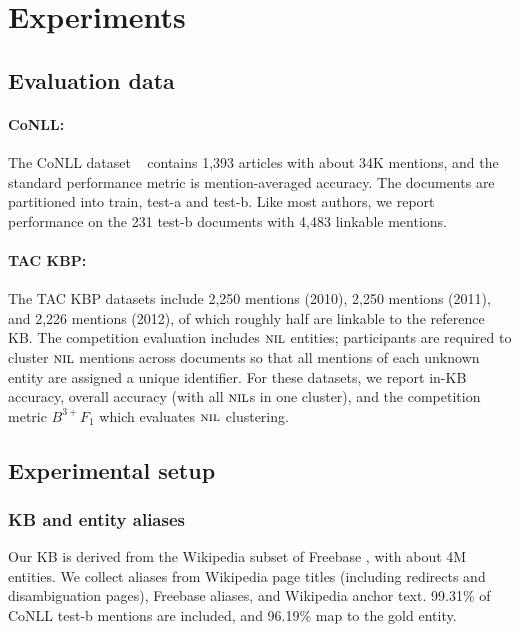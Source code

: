 \section{Experiments}
\label{sec:expt}

\subsection{Evaluation data}

\paragraph*{CoNLL:} 
The CoNLL dataset ~\cite{Hoffart2011} contains 1,393 articles with
about 34K mentions, and the standard performance metric is
mention-averaged accuracy.  The documents are partitioned into train,
test-a and test-b.  Like most authors, we report performance on the
231 test-b documents with 4,483 linkable mentions.

\paragraph*{TAC KBP:} 
The TAC KBP datasets \cite{TAC2010,TAC2011,TAC2012} include 2,250 mentions (2010),
2,250 mentions (2011), and 2,226 mentions (2012), 
of which roughly half are linkable
to the reference KB.  The competition evaluation includes $\mbox{\textsc{nil}}$
entities; participants are required to cluster $\mbox{\textsc{nil}}$ mentions across
documents so that all mentions of each unknown entity are assigned a
unique identifier.  For these datasets, we report in-KB accuracy,
overall accuracy (with all $\mbox{\textsc{nil}}$s in one cluster), and the competition
metric $B^{3+} F_1$ which evaluates $\mbox{\textsc{nil}}$ clustering.

\subsection{Experimental setup}

\subsubsection{KB and entity aliases}

Our KB is derived from the Wikipedia subset of Freebase
\cite{BollackerEPST08}, with about 4M entities.  We collect aliases
from Wikipedia page titles (including redirects and disambiguation
pages), Freebase aliases, and Wikipedia anchor text.  
99.31\% of CoNLL test-b mentions are included, and 96.19\% map to the gold entity.

